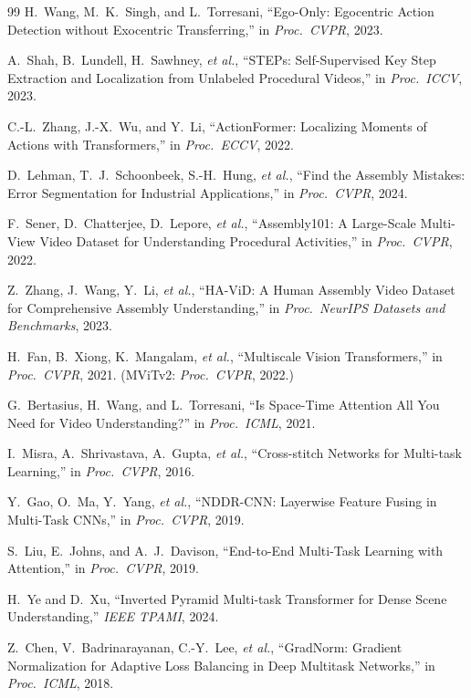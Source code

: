 \documentclass[10pt,twocolumn]{article}
\begin{document}
\begin{thebibliography}{99}
H.~Wang, M.~K.~Singh, and L.~Torresani,
``Ego-Only: Egocentric Action Detection without Exocentric Transferring,''
in \emph{Proc.\ CVPR}, 2023.

A.~Shah, B.~Lundell, H.~Sawhney, \emph{et al.},
``STEPs: Self-Supervised Key Step Extraction and Localization from Unlabeled Procedural Videos,''
in \emph{Proc.\ ICCV}, 2023.

C.-L.~Zhang, J.-X.~Wu, and Y.~Li,
``ActionFormer: Localizing Moments of Actions with Transformers,''
in \emph{Proc.\ ECCV}, 2022.

D.~Lehman, T.~J.~Schoonbeek, S.-H.~Hung, \emph{et al.},
``Find the Assembly Mistakes: Error Segmentation for Industrial Applications,''
in \emph{Proc.\ CVPR}, 2024.

F.~Sener, D.~Chatterjee, D.~Lepore, \emph{et al.},
``Assembly101: A Large-Scale Multi-View Video Dataset for Understanding Procedural Activities,''
in \emph{Proc.\ CVPR}, 2022.

Z.~Zhang, J.~Wang, Y.~Li, \emph{et al.},
``HA-ViD: A Human Assembly Video Dataset for Comprehensive Assembly Understanding,''
in \emph{Proc.\ NeurIPS Datasets and Benchmarks}, 2023.

H.~Fan, B.~Xiong, K.~Mangalam, \emph{et al.},
``Multiscale Vision Transformers,''
in \emph{Proc.\ CVPR}, 2021. (MViTv2: \emph{Proc.\ CVPR}, 2022.)

G.~Bertasius, H.~Wang, and L.~Torresani,
``Is Space-Time Attention All You Need for Video Understanding?''
in \emph{Proc.\ ICML}, 2021.

I.~Misra, A.~Shrivastava, A.~Gupta, \emph{et al.},
``Cross-stitch Networks for Multi-task Learning,''
in \emph{Proc.\ CVPR}, 2016.

Y.~Gao, O.~Ma, Y.~Yang, \emph{et al.},
``NDDR-CNN: Layerwise Feature Fusing in Multi-Task CNNs,''
in \emph{Proc.\ CVPR}, 2019.

S.~Liu, E.~Johns, and A.~J.~Davison,
``End-to-End Multi-Task Learning with Attention,''
in \emph{Proc.\ CVPR}, 2019.

H.~Ye and D.~Xu,
``Inverted Pyramid Multi-task Transformer for Dense Scene Understanding,''
\emph{IEEE TPAMI}, 2024.

Z.~Chen, V.~Badrinarayanan, C.-Y.~Lee, \emph{et al.},
``GradNorm: Gradient Normalization for Adaptive Loss Balancing in Deep Multitask Networks,''
in \emph{Proc.\ ICML}, 2018.


\end{thebibliography}
\end{document}
